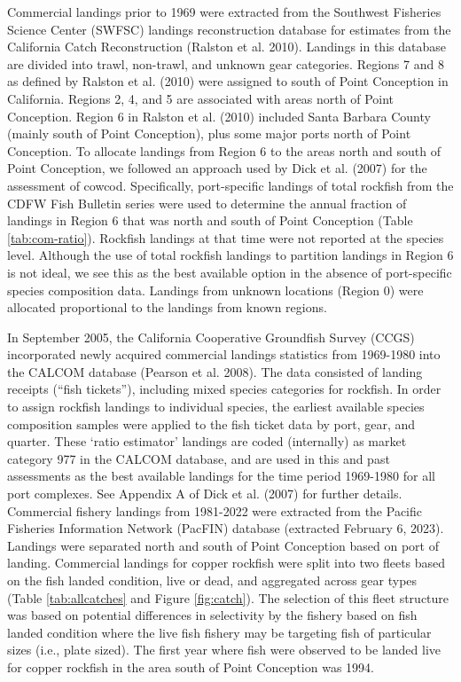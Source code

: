 \documentclass[11pt,
  english,
  letterpaper,
]{article}
\begin{document}
\hfill\break

Commercial landings prior to 1969 were extracted from the Southwest Fisheries Science Center (SWFSC) landings reconstruction database for estimates from the California Catch Reconstruction (Ralston et al. 2010). Landings in this database are divided into trawl, non-trawl, and unknown gear categories. Regions 7 and 8 as defined by Ralston et al. (2010) were assigned to south of Point Conception in California. Regions 2, 4, and 5 are associated with areas north of Point Conception. Region 6 in Ralston et al. (2010) included Santa Barbara County (mainly south of Point Conception), plus some major ports north of Point Conception. To allocate landings from Region 6 to the areas north and south of Point Conception, we followed an approach used by Dick et al. (2007) for the assessment of cowcod. Specifically, port-specific landings of total rockfish from the CDFW Fish Bulletin series were used to determine the annual fraction of landings in Region 6 that was north and south of Point Conception (Table \ref{tab:com-ratio}). Rockfish landings at that time were not reported at the species level. Although the use of total rockfish landings to partition landings in Region 6 is not ideal, we see this as the best available option in the absence of port-specific species composition data. Landings from unknown locations (Region 0) were allocated proportional to the landings from known regions.

In September 2005, the California Cooperative Groundfish Survey (CCGS) incorporated newly acquired commercial landings statistics from 1969-1980 into the CALCOM database (Pearson et al. 2008). The data consisted of landing receipts (``fish tickets''), including mixed species categories for rockfish. In order to assign rockfish landings to individual species, the earliest available species composition samples were applied to the fish ticket data by port, gear, and quarter. These `ratio estimator' landings are coded (internally) as market category 977 in the CALCOM database, and are used in this and past assessments as the best available landings for the time period 1969-1980 for all port complexes. See Appendix A of Dick et al. (2007) for further details. Commercial fishery landings from 1981-2022 were extracted from the Pacific Fisheries Information Network (PacFIN) database (extracted February 6, 2023). Landings were separated north and south of Point Conception based on port of landing. Commercial landings for copper rockfish were split into two fleets based on the fish landed condition, live or dead, and aggregated across gear types (Table \ref{tab:allcatches} and Figure \ref{fig:catch}). The selection of this fleet structure was based on potential differences in selectivity by the fishery based on fish landed condition where the live fish fishery may be targeting fish of particular sizes (i.e., plate sized). The first year where fish were observed to be landed live for copper rockfish in the area south of Point Conception was 1994.
\end{document}

